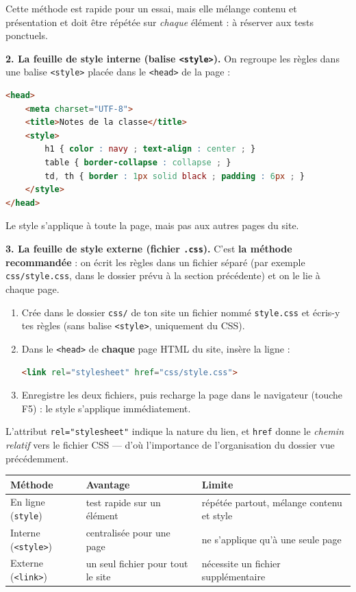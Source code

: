 \documentclass[11pt]{article}
\begin{document}
Cette méthode est rapide pour un essai, mais elle mélange contenu et présentation et doit être répétée sur \emph{chaque} élément : à réserver aux tests ponctuels.

\textbf{2. La feuille de style interne (balise \texttt{<style>}).} On regroupe les règles dans une balise \texttt{<style>} placée dans le \texttt{<head>} de la page :

\begin{lstlisting}[language=HTML]
<head>
    <meta charset="UTF-8">
    <title>Notes de la classe</title>
    <style>
        h1 { color : navy ; text-align : center ; }
        table { border-collapse : collapse ; }
        td, th { border : 1px solid black ; padding : 6px ; }
    </style>
</head>
\end{lstlisting}

Le style s'applique à toute la page, mais pas aux autres pages du site.

\textbf{3. La feuille de style externe (fichier \texttt{.css}).} C'est \textbf{la méthode recommandée} : on écrit les règles dans un fichier séparé (par exemple \texttt{css/style.css}, dans le dossier prévu à la section précédente) et on le lie à chaque page.

\begin{methode}
\begin{enumerate}
\item Crée dans le dossier \texttt{css/} de ton site un fichier nommé \texttt{style.css} et écris-y tes règles (sans balise \texttt{<style>}, uniquement du CSS).
\item Dans le \texttt{<head>} de \textbf{chaque} page HTML du site, insère la ligne :
\begin{lstlisting}[language=HTML]
<link rel="stylesheet" href="css/style.css">
\end{lstlisting}
\item Enregistre les deux fichiers, puis recharge la page dans le navigateur (touche F5) : le style s'applique immédiatement.
\end{enumerate}
L'attribut \texttt{rel="stylesheet"} indique la nature du lien, et \texttt{href} donne le \emph{chemin relatif} vers le fichier CSS — d'où l'importance de l'organisation du dossier vue précédemment.
\end{methode}

\begin{center}
\begin{tabularx}{\linewidth}{|l|X|X|}
\hline
\rowcolor{popblueL} \textbf{Méthode} & \textbf{Avantage} & \textbf{Limite} \\
\hline
En ligne (\texttt{style}) & test rapide sur un élément & répétée partout, mélange contenu et style \\
\hline
Interne (\texttt{<style>}) & centralisée pour une page & ne s'applique qu'à une seule page \\
\hline
Externe (\texttt{<link>}) & un seul fichier pour tout le site & nécessite un fichier supplémentaire \\
\hline
\end{tabularx}
\end{center}
\end{document}
